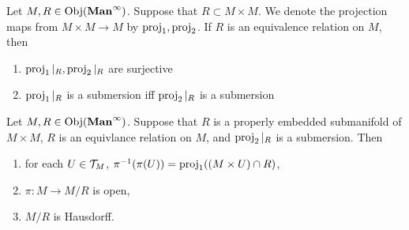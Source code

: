 \documentclass{book}
\begin{document}
	\begin{note}
		Let $M, R \in \operatorname{Obj}(\operatorname*{\text{\textbf{Man}}^{\infty}})$. Suppose that $R \subset M \times M$. We denote the projection maps from $M \times M \rightarrow M$ by $\operatorname{\text{proj}}_1, \operatorname{\text{proj}}_2$. If $R$ is an equivalence relation on $M$, then 
		\begin{enumerate}
			\item $\operatorname{\text{proj}}_1|_R, \operatorname{\text{proj}}_2|_R$ are surjective
			\item $\operatorname{\text{proj}}_1|_R$ is a submersion iff $\operatorname{\text{proj}}_2|_R$ is a submersion
		\end{enumerate}
	\end{note}
	
	
	\begin{ex} 
		Let $M, R \in \operatorname{Obj}(\operatorname*{\text{\textbf{Man}}^{\infty}})$. Suppose that $R$ is a properly embedded submanifold of $M \times M$, $R$ is an equivlance relation on $M$, and $\operatorname{\text{proj}}_2|_R$ is a submersion. Then 
		\begin{enumerate}
			\item for each $U \in \mathcal{T}_M$, $\pi^{-1}(\pi(U)) = \operatorname{\text{proj}}_1((M \times U) \cap R)$,
			\item $\pi:M \rightarrow M /R$ is open,
			\item $M / R$ is Hausdorff.
		\end{enumerate}
	\end{ex}
\end{document}
